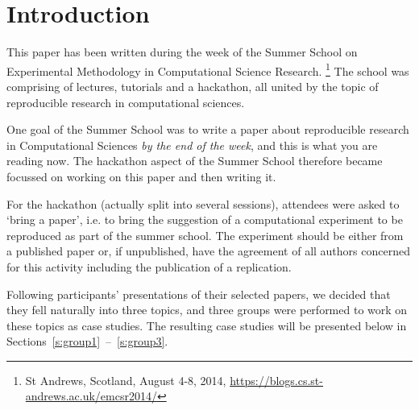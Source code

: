 \section{Introduction}
\label{s:intro}

This paper has been written during the week of the Summer School
on Experimental Methodology in Computational Science Research.
\footnote{St Andrews, Scotland, August 4-8, 2014,
\url{https://blogs.cs.st-andrews.ac.uk/emcsr2014/}} The 
school was comprising of lectures, tutorials and a hackathon,
all united by the topic of reproducible research in computational
sciences. 

One goal of the Summer School was to write a paper about reproducible research in
Computational Sciences \emph{by the end of the week}, and this is what you are reading now.
The hackathon aspect of the Summer School therefore became focussed on working on this paper
and then writing it. 

For the hackathon (actually split into several sessions), attendees 
were asked to `bring a paper', i.e. to bring the suggestion of a 
computational experiment to be reproduced as part of the summer school. 
The experiment should be either from a published paper or, if unpublished, 
have the agreement of all authors concerned for this activity including 
the publication of a replication.  

Following participants' presentations of their 
selected papers, we decided that they fell naturally into three topics, 
and three groups were performed to work on these topics as case studies.
The resulting case studies will be presented below
in Sections~\ref{s:group1}~--~\ref{s:group3}.



